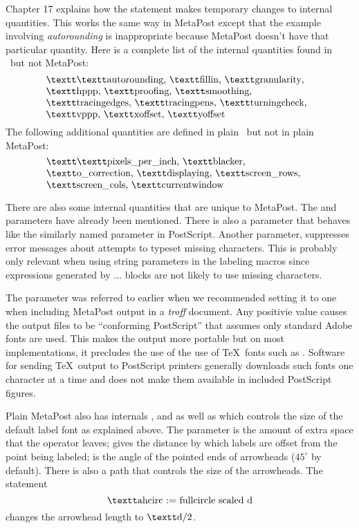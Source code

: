 Chapter 17 explains how the  statement makes temporary changes
to internal quantities.  This works the same way in MetaPost except that
the example involving {\it autorounding} is inappropriate because MetaPost
doesn't have that particular quantity.  Here is a complete list of the
internal quantities found in \MF\ but not MetaPost:
$$\vcenter{\hsize=.8\hsize \raggedright \multiply\rightskip by3 \textt\noindent
	\lit{autorounding}, \lit{fillin}, \lit{granularity}, \lit{hppp},
	\lit{proofing}, \lit{smoothing}, \lit{tracingedges},
	\lit{tracingpens}, \lit{turningcheck}, \lit{vppp}, \lit{xoffset},
	\lit{yoffset}}
$$
The following additional quantities are defined in plain \MF\ but not in
plain MetaPost:
$$\vcenter{\hsize=.8\hsize \raggedright \multiply\rightskip by3 \textt\noindent
	\lit{pixels\_per\_inch}, \lit{blacker}, \lit{o\_correction},
	\lit{displaying}, \lit{screen\_rows}, \lit{screen\_cols},
	\lit{currentwindow}}
$$

There are also some internal quantities that are unique to MetaPost.
The  and  parameters have already been mentioned.
There is also a  parameter that behaves like the similarly
named parameter in PostScript.  Another parameter, 
suppresses error messages about attempts to typeset missing characters.
This is probably only relevant when using string parameters in the labeling
macros since expressions generated by  $\ldots$ 
blocks are not likely to use missing characters.  

The  parameter was referred to earlier when we recommended
setting it to one when including MetaPost output in a {\it troff\/} document.
Any positivie value causes the output files to be ``conforming PostScript''
that assumes only standard Adobe fonts are used.  This makes the output
more portable but on most implementations, it precludes the use of the use
of \TeX\ fonts such as .  Software for sending \TeX\ output to
PostScript printers generally downloads such fonts one character at a time
and does not make them available in included PostScript figures.

Plain MetaPost also has
internals ,  and 
as well as  which controls the size of the default label
font as explained above.  The  parameter is the amount of
extra space that the  operator leaves;  gives the
distance by which labels are offset from the point being labeled;
 is the angle of the pointed ends of arrowheads
($45^\circ$ by default).  There is also a path  that controls
the size of the arrowheads.  The statement
$$ \lit{ahcirc := fullcircle scaled d} $$
changes the arrowhead length to $\lit{d}/2$.

